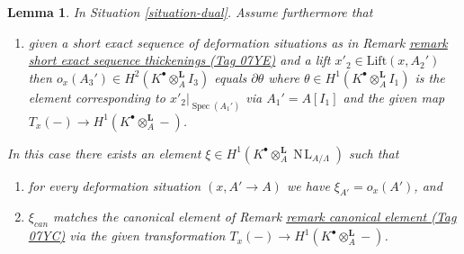 \documentclass{amsart}
\theoremstyle{plain}
\newtheorem{lemma}[subsection]{Lemma}
\theoremstyle{definition}
\theoremstyle{remark}
\numberwithin{equation}{subsection}
\def\Spec{\mathop{\mathrm{Spec}}}
\def\NL{\mathop{N\!L}\nolimits}
\begin{document}
\begin{lemma}
\label{lemma-dual-obstruction}
In Situation \ref{situation-dual}. Assume furthermore that
\begin{enumerate}
\item[(iv)] given a short exact sequence of deformation situations
as in Remark \href{https://stacks.math.columbia.edu/tag/07YE}{remark short exact sequence thickenings (Tag 07YE)} and
a lift $x'_2 \in \text{Lift}(x, A_2')$ then
$o_x(A_3') \in H^2(K^\bullet \otimes_A^\mathbf{L} I_3)$
equals $\partial\theta$ where
$\theta \in H^1(K^\bullet \otimes_A^\mathbf{L} I_1)$
is the element corresponding to $x'_2|_{\Spec(A_1')}$ via
$A_1' = A[I_1]$ and the given map
$T_x(-) \to H^1(K^\bullet \otimes_A^\mathbf{L} -)$.
\end{enumerate}
In this case there exists an element
$\xi \in H^1(K^\bullet \otimes_A^\mathbf{L} \NL_{A/\Lambda})$
such that
\begin{enumerate}
\item for every deformation situation $(x, A' \to A)$ we have
$\xi_{A'} = o_x(A')$, and
\item $\xi_{can}$ matches the canonical element of
Remark \href{https://stacks.math.columbia.edu/tag/07YC}{remark canonical element (Tag 07YC)} via the given transformation
$T_x(-) \to H^1(K^\bullet \otimes_A^\mathbf{L} -)$.
\end{enumerate}
\end{lemma}
\end{document}
